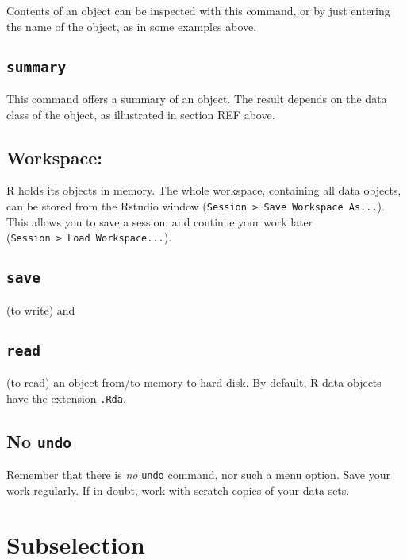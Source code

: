 \documentclass[]{book}
\begin{document}
Contents of an object can be inspected with this command, or by just
entering the name of the object, as in some examples above.

\hypertarget{summary}{%
\subsection{\texorpdfstring{\texttt{summary}}{summary}}\label{summary}}

This command offers a summary of an object. The result depends on
the data class of the object, as illustrated in section REF
above.

\hypertarget{workspace}{%
\subsection{Workspace:}\label{workspace}}

R holds its objects in memory. The whole workspace,
containing all data objects, can be stored from the
Rstudio window (\texttt{Session\ \textgreater{}\ Save\ Workspace\ As...}).
This allows you to save a
session, and continue your work later (\texttt{Session\ \textgreater{}\ Load\ Workspace...}).

\hypertarget{save}{%
\subsection{\texorpdfstring{\texttt{save}}{save}}\label{save}}

(to write) and

\hypertarget{read}{%
\subsection{\texorpdfstring{\texttt{read}}{read}}\label{read}}

(to read) an object from/to memory to hard disk. By default,
R data objects have the extension \texttt{.Rda}.

\hypertarget{no-undo}{%
\subsection{\texorpdfstring{No \texttt{undo}}{No undo}}\label{no-undo}}

Remember that there is \emph{no} \texttt{undo} command, nor such a menu
option. Save your work regularly. If in doubt, work with scratch
copies of your data sets.

\hypertarget{sec:subselection}{%
\section{Subselection}\label{sec:subselection}}
\end{document}
